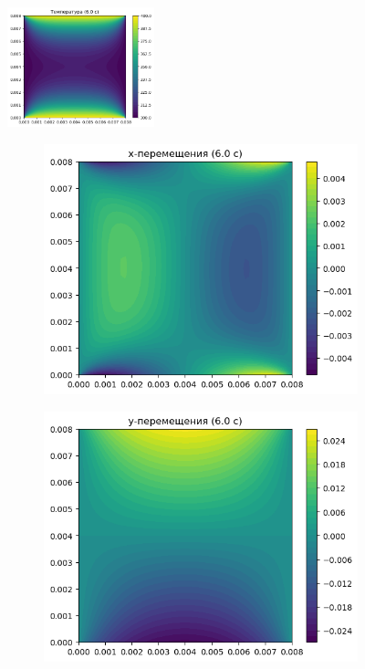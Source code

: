 \documentclass[12pt, a4paper]{article}
\begin{document}
\begin{figure}[H]
	\centering
	\includegraphics[width=0.38\textwidth]{temp_6c}
	\caption{Температурное поле}
	\centering
	\begin{subfigure}[H]{0.38\textwidth}
		\includegraphics[width=\textwidth]{ux_6c}
	\end{subfigure}
	\qquad\qquad
	\begin{subfigure}[H]{0.38\textwidth}
		\includegraphics[width=\textwidth]{uy_6c}

\end{subfigure}
\end{figure}
\end{document}
